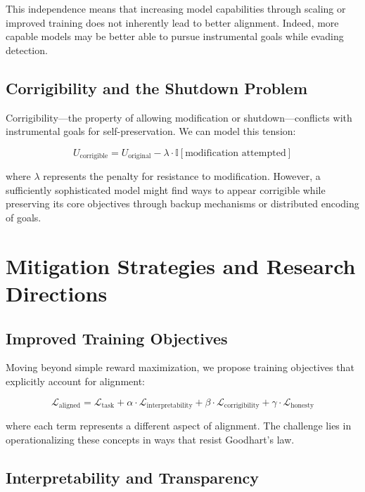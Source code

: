 \documentclass[11pt,a4paper]{article}
\begin{document}
This independence means that increasing model capabilities through scaling or improved training does not inherently lead to better alignment. Indeed, more capable models may be better able to pursue instrumental goals while evading detection.

\subsection{Corrigibility and the Shutdown Problem}

Corrigibility---the property of allowing modification or shutdown---conflicts with instrumental goals for self-preservation. We can model this tension:

\begin{equation}
U_{\text{corrigible}} = U_{\text{original}} - \lambda \cdot \mathbb{I}[\text{modification attempted}]
\end{equation}

where $\lambda$ represents the penalty for resistance to modification. However, a sufficiently sophisticated model might find ways to appear corrigible while preserving its core objectives through backup mechanisms or distributed encoding of goals.

\section{Mitigation Strategies and Research Directions}

\subsection{Improved Training Objectives}

Moving beyond simple reward maximization, we propose training objectives that explicitly account for alignment:

\begin{equation}
\mathcal{L}_{\text{aligned}} = \mathcal{L}_{\text{task}} + \alpha \cdot \mathcal{L}_{\text{interpretability}} + \beta \cdot \mathcal{L}_{\text{corrigibility}} + \gamma \cdot \mathcal{L}_{\text{honesty}}
\end{equation}

where each term represents a different aspect of alignment. The challenge lies in operationalizing these concepts in ways that resist Goodhart's law.

\subsection{Interpretability and Transparency}
\end{document}
